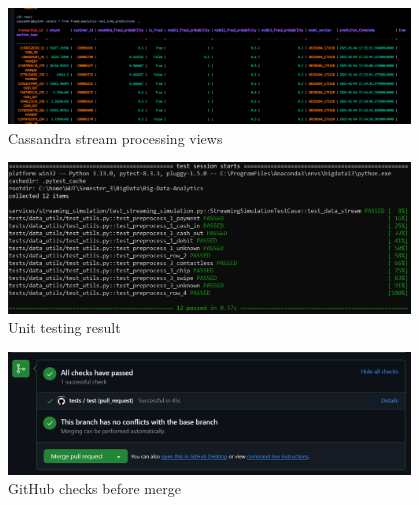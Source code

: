 \documentclass[12pt,a4paper, hidelinks]{article}
\begin{document}
\begin{figure}[h!]
  \centering
  \includegraphics[width=0.95\textwidth]{images/m3-cassandra-streaming-processing.png}
  \caption{Cassandra stream processing views}
  \label{fig:cassandra-strean}
\end{figure}




\begin{figure}[h!]
  \centering
  \includegraphics[width=0.95\textwidth]{images/unittests-M2.png}
  \caption{Unit testing result}
  \label{fig:unittests}
\end{figure}



\begin{figure}[h!]
  \centering
  \includegraphics[width=0.95\textwidth]{images/github-checks-M2.PNG}
  \caption{GitHub checks before merge}
  \label{fig:github}
\end{figure}
\end{document}

